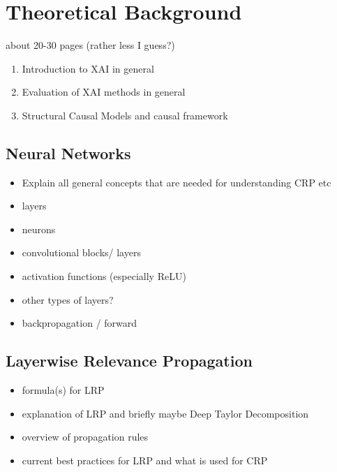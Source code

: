 \chapter{Theoretical Background}\label{chapter:background}

{ \color{red} 

about 20-30 pages (rather less I guess?)

\begin{enumerate}
    \item Introduction to XAI in general
    \item Evaluation of XAI methods in general
    \item Structural Causal Models and causal framework
\end{enumerate}
 }

\section{Neural Networks}
\begin{itemize}
    \item Explain all general concepts that are needed for understanding CRP etc
    \item layers
    \item neurons
    \item convolutional blocks/ layers
    \item activation functions (especially ReLU)
    \item other types of layers? 
    \item backpropagation / forward
\end{itemize}

\section{Layerwise Relevance Propagation}
\begin{itemize}
    \item formula(s) for LRP
    \item explanation of LRP and briefly maybe Deep Taylor Decomposition
    \item overview of propagation rules \cite{Montavon2019}  
    \item current best practices for LRP and what is used for CRP
\end{itemize}

